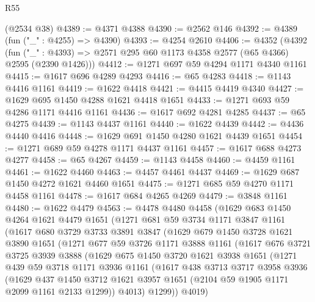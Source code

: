 \begin{lexlean}{R55}
\begin{coremodule}
    (@2534 @38)
@4389 := @4371 @4388
@4390 := @2562 @146
@4392 := @4389 (fun ("_" : @4255) => @4390)
@4393 := @4254 @2610
@4406 := @4352
    (@4392 (fun ("_" : @4393) => @2571 @295 @60 @1173 @4358 @2577 (@65 @4366) @2595 (@2390 @1426)))
@4412 := @1271 @697 @59 @4294 @1171 @4340 @1161
@4415 := @1617 @696 @4289 @4293
@4416 := @65 @4283
@4418 := @1143 @4416 @1161
@4419 := @1622 @4418
@4421 := @4415 @4419 @4340
@4427 := @1629 @695 @1450 @4288 @1621 @4418 @1651
@4433 := @1271 @693 @59 @4286 @1171 @4416 @1161
@4436 := @1617 @692 @4281 @4285
@4437 := @65 @4275
@4439 := @1143 @4437 @1161
@4440 := @1622 @4439
@4442 := @4436 @4440 @4416
@4448 := @1629 @691 @1450 @4280 @1621 @4439 @1651
@4454 := @1271 @689 @59 @4278 @1171 @4437 @1161
@4457 := @1617 @688 @4273 @4277
@4458 := @65 @4267
@4459 := @1143 @4458
@4460 := @4459 @1161
@4461 := @1622 @4460
@4463 := @4457 @4461 @4437
@4469 := @1629 @687 @1450 @4272 @1621 @4460 @1651
@4475 := @1271 @685 @59 @4270 @1171 @4458 @1161
@4478 := @1617 @684 @4265 @4269
@4479 := @3848 @1161
@4480 := @1622 @4479
@4563 := @4478
    @4480
    @4458
    (@1629
      @683
      @1450
      @4264
      @1621
      @4479
      @1651
      (@1271
        @681
        @59
        @3734
        @1171
        @3847
        @1161
        (@1617
          @680
          @3729
          @3733
          @3891
          @3847
          (@1629
            @679
            @1450
            @3728
            @1621
            @3890
            @1651
            (@1271
              @677
              @59
              @3726
              @1171
              @3888
              @1161
              (@1617
                @676
                @3721
                @3725
                @3939
                @3888
                (@1629
                  @675
                  @1450
                  @3720
                  @1621
                  @3938
                  @1651
                  (@1271
                    @439
                    @59
                    @3718
                    @1171
                    @3936
                    @1161
                    (@1617
                      @438
                      @3713
                      @3717
                      @3958
                      @3936
                      (@1629
                        @437
                        @1450
                        @3712
                        @1621
                        @3957
                        @1651
                        (@2104 @59 @1905 @1171 @2099 @1161 @2133 @1299))
                      @4013)
                    @1299))
                @4019)

\end{coremodule}
\end{lexlean}

